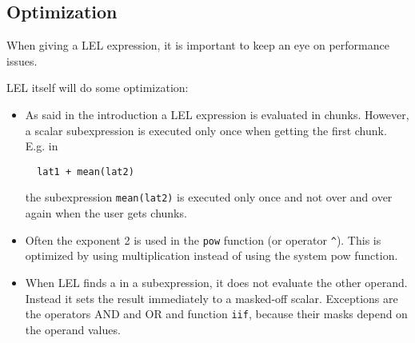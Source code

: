 \subsection{Optimization}
When giving a LEL expression, it is important to keep an eye
on performance issues.

LEL itself will do some optimization:
\begin{itemize}
\item As said in the introduction a LEL expression is evaluated
in chunks. However, a scalar subexpression is executed only once
when getting the first chunk.
E.g. in
  \begin{verbatim}
  lat1 + mean(lat2)
  \end{verbatim}
the subexpression \texttt{mean(lat2)} is executed only once
and not over and over again when the user gets chunks.

\item Often the exponent 2 is used in the \texttt{pow} function
(or operator \verb+^+). This is optimized by using multiplication
instead of using the system pow function.

\item When LEL finds a 
in a subexpression, it does not evaluate the other operand.
Instead it sets the result immediately to a masked-off scalar.
Exceptions are the operators AND and OR and function \texttt{iif},
because their masks depend on the operand values.
\end{itemize}

